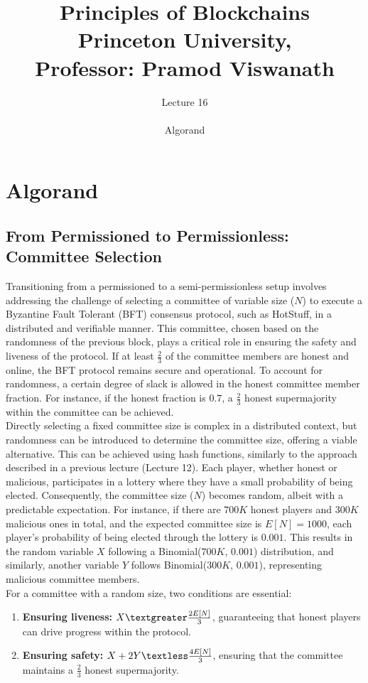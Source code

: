 \documentclass{report}
\title{\Huge{Principles of Blockchains \\ Princeton University,\\
		Professor: Pramod Viswanath}}
\author{\huge{Lecture 16} \\\\ Algorand}
\begin{document}
\maketitle
\newpage%
\tableofcontents
\pagebreak

\chapter{Algorand}
\section{From Permissioned to Permissionless: Committee Selection}
Transitioning from a permissioned to a semi-permissionless setup involves addressing the challenge of selecting a committee of variable size ($N$) to execute a Byzantine Fault Tolerant (BFT) consensus protocol, such as HotStuff, in a distributed and verifiable manner. This committee, chosen based on the randomness of the previous block, plays a critical role in ensuring the safety and liveness of the protocol. If at least $\frac{2}{3}$ of the committee members are honest and online, the BFT protocol remains secure and operational. To account for randomness, a certain degree of slack is allowed in the honest committee member fraction. For instance, if the honest fraction is $0.7$, a $\frac{2}{3}$ honest supermajority within the committee can be achieved.\\
Directly selecting a fixed committee size is complex in a distributed context, but randomness can be introduced to determine the committee size, offering a viable alternative. This can be achieved using hash functions, similarly to the approach described in a previous lecture (Lecture 12). Each player, whether honest or malicious, participates in a lottery where they have a small probability of being elected. Consequently, the committee size ($N$) becomes random, albeit with a predictable expectation. For instance, if there are $700K$ honest players and $300K$ malicious ones in total, and the expected committee size is $E[N] = 1000$, each player's probability of being elected through the lottery is $0.001$. This results in the random variable $X$ following a Binomial($700K$, $0.001$) distribution, and similarly, another variable $Y$ follows Binomial($300K$, $0.001$), representing malicious committee members.\\
For a committee with a random size, two conditions are essential: 
\begin{enumerate}
	\item \textbf{Ensuring liveness:} $X \textgreater \frac{2E[N]}{3}$, guaranteeing that honest players can drive progress within the protocol.
	\item \textbf{Ensuring safety:}  $X + 2Y \textless \frac{4E[N]}{3}$, ensuring that the committee maintains a $\frac{2}{3}$ honest supermajority.
\end{enumerate}
\end{document}
